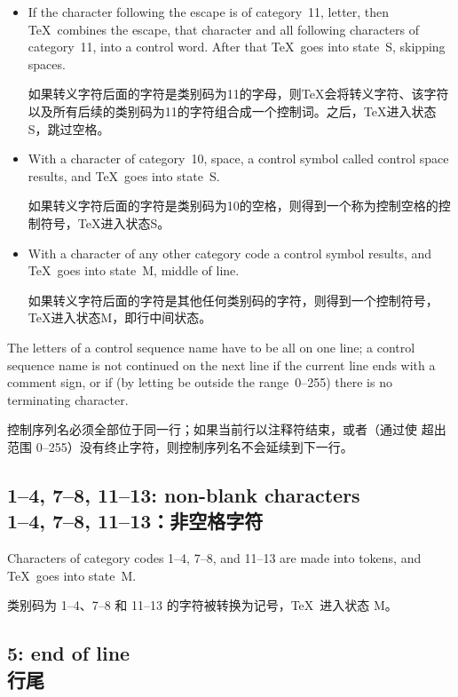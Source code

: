 \begin{itemize}\item
If the character following the escape is of category~11,
letter, then \TeX\ combines the escape,
that character and all following
characters of category~11, into a control word.
After that \TeX\
goes into state~{\italic S}, skipping spaces.

如果转义字符后面的字符是类别码为11的字母，则\TeX 会将转义字符、该字符以及所有后续的类别码为11的字符组合成一个控制词。之后，\TeX 进入状态{\italic S}，跳过空格。
\item
With a character of category~10, space,
a control symbol called control space results, 
and \TeX\ goes into state~{\italic S}.

如果转义字符后面的字符是类别码为10的空格，则得到一个称为控制空格的控制符号，\TeX 进入状态{\italic S}。
\item
With a character of any other category code 
a control symbol results, and \TeX\ goes into state~{\italic M},
middle of line.

如果转义字符后面的字符是其他任何类别码的字符，则得到一个控制符号，\TeX 进入状态{\italic M}，即行中间状态。
\end{itemize}


The letters of a control sequence name have to be all on one line;
a control sequence name is not continued on the next line
if the current line ends with a comment sign, or if (by letting
 be outside the range~0--255) 
there is no terminating character.

控制序列名必须全部位于同一行；如果当前行以注释符结束，或者（通过使  超出范围 0--255）没有终止字符，则控制序列名不会延续到下一行。

\subsection{1--4, 7--8, 11--13: non-blank characters\\1--4, 7--8, 11--13：非空格字符}

Characters of category codes 1--4, 7--8, and 11--13 are made
into tokens, and \TeX\ goes into state~{\italic M}.

类别码为 1--4、7--8 和 11--13 的字符被转换为记号，\TeX\ 进入状态 {\italic M}。



\subsection{5: end of line\\行尾}%

